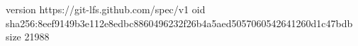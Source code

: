 version https://git-lfs.github.com/spec/v1
oid sha256:8eef9149b3e112e8edbc8860496232f26b4a5aed5057060542641260d1c47bdb
size 21988
